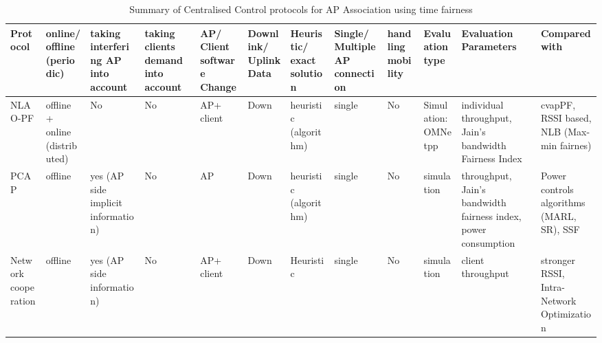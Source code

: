 \documentclass[journal,transmag]{IEEEtran}
\begin{document}
\begin{table}
\centering\caption{Summary of Centralised Control protocols for AP Association using time fairness \label{Tab:centralised_time_fairness}}
\begin{tabular} {|p{1.0cm}|p{.7cm}|p{1.2cm}|p{.7cm}|p{1.1cm}|p{.95cm}|p{}|p{.7cm}|p{.7cm} |p{1.75cm}|p{}|p{}|}
\hline
\cellcolor{xy}\scriptsize{Protocol} & \cellcolor{xy}\scriptsize{online/ offline (periodic)} & \cellcolor{xy}\scriptsize{taking interfering AP into account} & \cellcolor{xy}\scriptsize{taking clients demand into account} & \cellcolor{xy}\scriptsize{AP/ Client software Change} & \cellcolor{xy} \scriptsize{Downlink/ Uplink Data} & \cellcolor{xy} \scriptsize{Heuristic/ exact solution} & \cellcolor{xy} \scriptsize{Single/ Multiple AP connection} & \cellcolor{xy} \scriptsize{handling mobility} & \cellcolor{xy}\scriptsize{Evaluation type} & \cellcolor{xy}\scriptsize{Evaluation Parameters} & \cellcolor{xy}\scriptsize{Compared with} \\\hline\hline

\scriptsize{NLAO-PF \cite{10approximate_optimisation_proportional,14AP_association_multirate_WLAN}} &\scriptsize{offline + online (distributed)} &\scriptsize{No} &\scriptsize{No} &\scriptsize{AP+ client} &\scriptsize{Down} &\scriptsize{heuristic (algorithm)} &\scriptsize{single} &\scriptsize{No} &\scriptsize{Simulation:  OMNetpp} &\scriptsize{individual throughput, Jain's bandwidth Fairness Index} &\scriptsize{cvapPF\cite{08proportional_fairness_multiRate_LAN}, RSSI based, NLB (Max-min fairnes)\cite{10Practical_AP_Association}} \\\hline

\scriptsize{PCAP \cite{11proportional_fairness_power_control}} &\scriptsize{offline} &\scriptsize{yes (AP side implicit information)} &\scriptsize{No} &\scriptsize{AP} &\scriptsize{Down} &\scriptsize{heuristic (algorithm)} &\scriptsize{single} &\scriptsize{No} &\scriptsize{simulation} &\scriptsize{throughput, Jain's bandwidth fairness index, power consumption} &\scriptsize{Power controls algorithms (MARL, SR), SSF} \\\hline

\scriptsize{Network cooperation \cite{12Network_cooperation_AP_association}} &\scriptsize{offline} &\scriptsize{yes (AP side information)} &\scriptsize{No} &\scriptsize{AP+ client} &\scriptsize{Down} &\scriptsize{Heuristic} &\scriptsize{single} &\scriptsize{No} &\scriptsize{simulation} &\scriptsize{client throughput} &\scriptsize{stronger RSSI, Intra-Network Optimization} \\\hline


\end{tabular}
\end{table}
\end{document}
